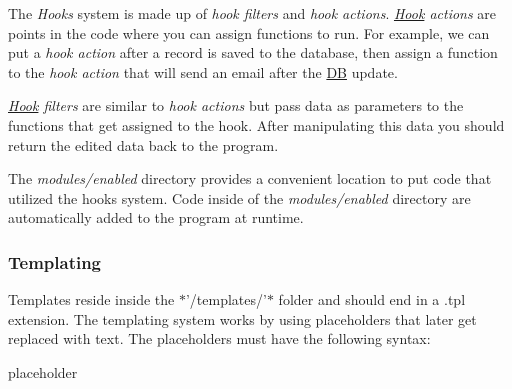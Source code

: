 The {\itshape Hooks} system is made up of {\itshape hook filters} and {\itshape hook actions}. {\itshape \hyperlink{class_hook}{Hook} actions} are points in the code where you can assign functions to run. For example, we can put a {\itshape hook action} after a record is saved to the database, then assign a function to the {\itshape hook action} that will send an email after the \hyperlink{class_d_b}{D\-B} update. 


{\itshape \hyperlink{class_hook}{Hook} filters} are similar to {\itshape hook actions} but pass data as parameters to the functions that get assigned to the hook. After manipulating this data you should return the edited data back to the program. 


The {\itshape modules/enabled} directory provides a convenient location to put code that utilized the hooks system. Code inside of the {\itshape modules/enabled} directory are automatically added to the program at runtime.

\subsubsection*{Templating}

Templates reside inside the $\ast$'/templates/'$\ast$ folder and should end in a .tpl extension. The templating system works by using placeholders that later get replaced with text. The placeholders must have the following syntax\-: \begin{DoxyVerb}           {{ placeholder }}
\end{DoxyVerb}


